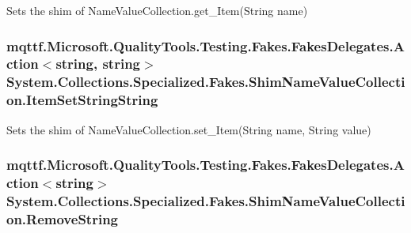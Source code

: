 Sets the shim of Name\-Value\-Collection.\-get\-\_\-\-Item(\-String name)

\hypertarget{class_system_1_1_collections_1_1_specialized_1_1_fakes_1_1_shim_name_value_collection_afabb161561f1a03049191f31d6285410}{
\subsubsection[{Item\-Set\-String\-String}]{\setlength{\rightskip}{0pt plus 5cm}mqttf.\-Microsoft.\-Quality\-Tools.\-Testing.\-Fakes.\-Fakes\-Delegates.\-Action$<$string, string$>$ System.\-Collections.\-Specialized.\-Fakes.\-Shim\-Name\-Value\-Collection.\-Item\-Set\-String\-String\hspace{0.3cm}{\ttfamily [set]}}}\label{class_system_1_1_collections_1_1_specialized_1_1_fakes_1_1_shim_name_value_collection_afabb161561f1a03049191f31d6285410}


Sets the shim of Name\-Value\-Collection.\-set\-\_\-\-Item(\-String name, String value)

\hypertarget{class_system_1_1_collections_1_1_specialized_1_1_fakes_1_1_shim_name_value_collection_a1fb937cffa3d93de1018363fcf38b339}{
\subsubsection[{Remove\-String}]{\setlength{\rightskip}{0pt plus 5cm}mqttf.\-Microsoft.\-Quality\-Tools.\-Testing.\-Fakes.\-Fakes\-Delegates.\-Action$<$string$>$ System.\-Collections.\-Specialized.\-Fakes.\-Shim\-Name\-Value\-Collection.\-Remove\-String\hspace{0.3cm}{\ttfamily [set]}}}\label{class_system_1_1_collections_1_1_specialized_1_1_fakes_1_1_shim_name_value_collection_a1fb937cffa3d93de1018363fcf38b339}


